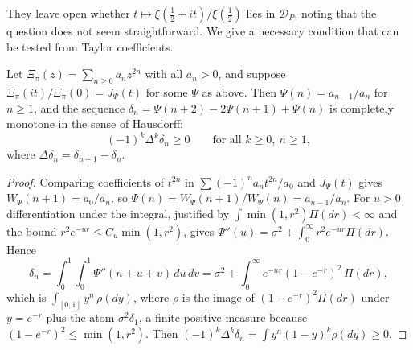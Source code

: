 They leave open whether $t\mapsto\xi(\frac12+it)/\xi(\frac12)$ lies in $\mathcal D_P$, noting that the question does not seem straightforward. We give a necessary condition that can be tested from Taylor coefficients.

\begin{proposition}\label{prop:10dpatietest}
Let $\Xi_\pi(z) = \sum_{n\ge0}a_nz^{2n}$ with all $a_n>0$, and suppose $\Xi_\pi(it)/\Xi_\pi(0) = J_\Psi(t)$ for some $\Psi$ as above. Then $\Psi(n) = a_{n-1}/a_n$ for $n\ge1$, and the sequence $\delta_n = \Psi(n+2)-2\Psi(n+1)+\Psi(n)$ is completely monotone in the sense of Hausdorff:
\[
(-1)^k\Delta^k\delta_n\ge0\qquad\text{for all }k\ge0,\ n\ge1,
\]
where $\Delta\delta_n = \delta_{n+1}-\delta_n$.
\end{proposition}

\begin{proof}
Comparing coefficients of $t^{2n}$ in $\sum(-1)^na_nt^{2n}/a_0$ and $J_\Psi(t)$ gives $W_\Psi(n+1) = a_0/a_n$, so $\Psi(n) = W_\Psi(n+1)/W_\Psi(n) = a_{n-1}/a_n$. For $u>0$ differentiation under the integral, justified by $\int\min(1,r^2)\Pi(dr)<\infty$ and the bound $r^2e^{-ur}\le C_u\min(1,r^2)$, gives $\Psi''(u) = \sigma^2+\int_0^\infty r^2e^{-ur}\Pi(dr)$. Hence
\[
\delta_n = \int_0^1\!\!\int_0^1\Psi''(n+u+v)\,du\,dv = \sigma^2+\int_0^\infty e^{-nr}(1-e^{-r})^2\,\Pi(dr),
\]
which is $\int_{[0,1]}y^n\,\rho(dy)$, where $\rho$ is the image of $(1-e^{-r})^2\Pi(dr)$ under $y = e^{-r}$ plus the atom $\sigma^2\delta_1$, a finite positive measure because $(1-e^{-r})^2\le\min(1,r^2)$. Then $(-1)^k\Delta^k\delta_n = \int y^n(1-y)^k\rho(dy)\ge0$.
\end{proof}

